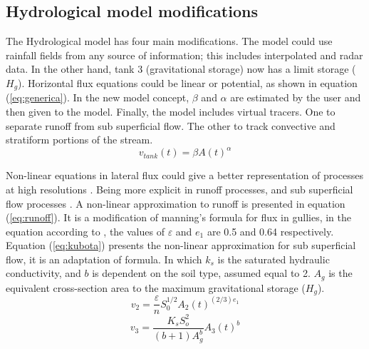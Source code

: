 {\subsection{Hydrological model modifications}

The Hydrological model has four main modifications.  The model could use rainfall fields from any source of information; this includes interpolated and radar data.  In the other hand, tank 3 (gravitational storage) now has a limit storage ($H_g$). Horizontal flux equations could be linear or potential, as shown in equation (\ref{eq:generica}).  In the new model concept, $\beta$ and $\alpha$ are estimated by the user and then given to the model. Finally, the model includes virtual tracers.  One to separate runoff from sub superficial flow.  The other to track convective and stratiform portions of the stream.\\  

\begin{equation}
 v_{tank}(t) = \beta A(t) ^{\alpha}
    \label{eq:generica}
\end{equation}

Non-linear equations in lateral flux could give a better representation of processes at high resolutions \citep{Beven1981}. Being more explicit in runoff processes, and sub superficial flow processes \citep{Beven1981, Kirkby1967}.  A non-linear approximation to runoff is presented in equation (\ref{eq:runoff}).   It is a modification of manning's formula for flux in gullies, in the equation according to \citep{Foster1984}, the values of $\varepsilon$ and $e_1$ are 0.5 and 0.64 respectively.   Equation (\ref{eq:kubota}) presents the non-linear approximation for sub superficial flow,  it is an adaptation of \citet{Kubota1995} formula. In which $k_s$ is the saturated hydraulic conductivity, and $b$ is dependent on the soil type, assumed equal to 2.  $A_g$ is the equivalent cross-section area to the maximum gravitational storage ($H_g$). \\

\begin{equation}
 v_{2} = \frac{\varepsilon}{n}  S_{0}^{1/2} A_{2}(t)^{(2/3) e_1}
    \label{eq:runoff}
\end{equation}
\begin{equation}
 v_3 = \frac{K_s S_{o}^{2}}{(b+1) A_{g}^{b}} A_{3}(t)^{b}
    \label{eq:kubota}
\end{equation}

}
